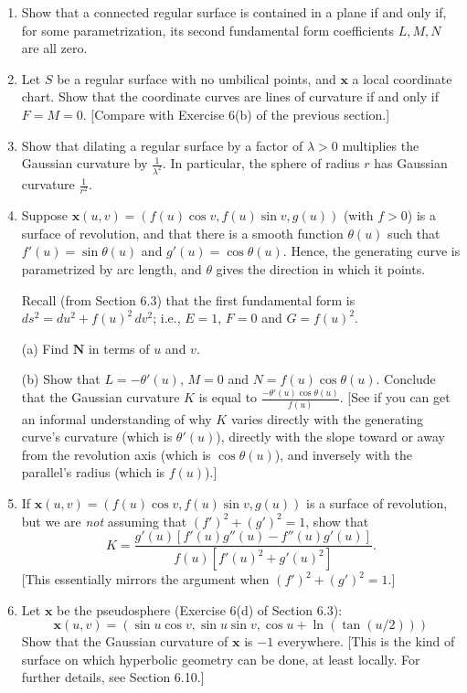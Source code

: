 \documentclass[leqno]{book}
\begin{document}
\begin{enumerate}
\item Show that a connected regular surface is contained in a plane if and only if, for some parametrization, its second fundamental form coefficients $L,M,N$ are all zero.

\item Let $S$ be a regular surface with no umbilical points, and $\mathbf x$ a local coordinate chart.  Show that the coordinate curves are lines of curvature if and only if $F=M=0$.  [Compare with Exercise 6(b) of the previous section.]

\item Show that dilating a regular surface by a factor of $\lambda>0$ multiplies the Gaussian curvature by $\frac 1{\lambda^2}$.  In particular, the sphere of radius $r$ has Gaussian curvature $\frac 1{r^2}$.

\item Suppose $\mathbf x(u,v)=(f(u)\cos v,f(u)\sin v,g(u))$ (with $f>0$) is a surface of revolution, and that there is a smooth function $\theta(u)$ such that $f'(u)=\sin\theta(u)$ and $g'(u)=\cos\theta(u)$.  Hence, the generating curve is parametrized by arc length, and $\theta$ gives the direction in which it points.

Recall (from Section 6.3) that the first fundamental form is $ds^2=du^2+f(u)^2\,dv^2$; i.e., $E=1$, $F=0$ and $G=f(u)^2$.

(a) Find $\mathbf N$ in terms of $u$ and $v$.

(b) Show that $L=-\theta'(u)$, $M=0$ and $N=f(u)\cos\theta(u)$.  Conclude that the Gaussian curvature $K$ is equal to $\frac{-\theta'(u)\cos\theta(u)}{f(u)}$.  [See if you can get an informal understanding of why $K$ varies directly with the generating curve's curvature (which is $\theta'(u)$), directly with the slope toward or away from the revolution axis (which is $\cos\theta(u)$), and inversely with the parallel's radius (which is $f(u)$).]

\item If $\mathbf x(u,v)=(f(u)\cos v,f(u)\sin v,g(u))$ is a surface of revolution, but we are \emph{not} assuming that $(f')^2+(g')^2=1$, show that
$$K=\frac{g'(u)[f'(u)g''(u)-f''(u)g'(u)]}{f(u)[f'(u)^2+g'(u)^2]}.$$
[This essentially mirrors the argument when $(f')^2+(g')^2=1$.]

\item Let $\mathbf x$ be the pseudosphere (Exercise 6(d) of Section 6.3):
$$\mathbf x(u,v)=(\sin u\cos v,\sin u\sin v,\cos u+\ln(\tan(u/2)))$$
Show that the Gaussian curvature of $\mathbf x$ is $-1$ everywhere.  [This is the kind of surface on which hyperbolic geometry can be done, at least locally.  For further details, see Section 6.10.]


\end{enumerate}
\end{document}
